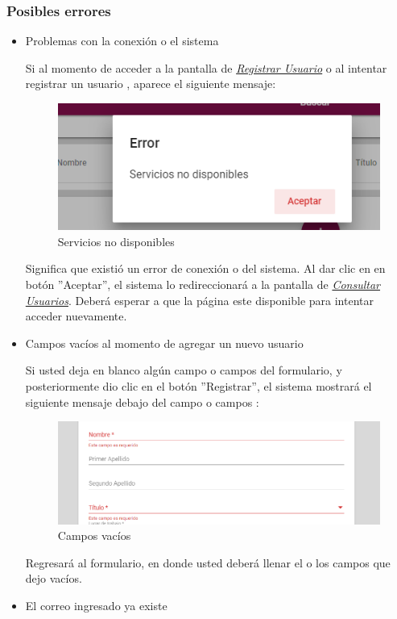 \subsubsection{Posibles errores}

\begin{itemize}
	\item Problemas con la conexión o el sistema

	Si al momento de acceder a la pantalla de \hyperlink{registrarUs}{\textit{Registrar Usuario}} o al intentar registrar un usuario , aparece el siguiente mensaje:

	\begin{figure}[H]
		\centering
		\includegraphics[width=0.4\linewidth]{images/SP5/MSGSN}
		\caption{Servicios no disponibles}
		\label{SND}

	\end{figure}

	Significa que existió un error de conexión o del sistema. Al dar clic en en botón ''Aceptar'', el sistema lo redireccionará a la pantalla de \hyperlink{consultarUs}{\textit{Consultar Usuarios}}. Deberá esperar a que la página este disponible para  intentar acceder nuevamente.

	\item Campos vacíos al momento de agregar un nuevo usuario

	Si usted deja en blanco algún campo o campos del formulario, y posteriormente dio clic en el botón ''Registrar'', el sistema mostrará el siguiente mensaje debajo del campo o campos :

	\begin{figure}[H]
		\centering
		\includegraphics[width=0.4\linewidth]{images/SP5/MSG44}
		\caption{Campos vacíos}
		\label{mensaje44}
	\end{figure}

	Regresará al formulario, en donde usted deberá llenar el o los campos que dejo vacíos.

	\item El correo ingresado ya existe


\end{itemize}
